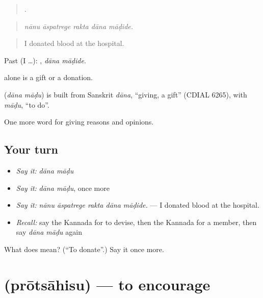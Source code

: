 \begin{quote}
    .
\end{quote}

\begin{quote}
\emph{nānu āspatrege rakta dāna māḍide.}
\end{quote}

\begin{quote}
I donated blood at the hospital.
\end{quote}

Past (I …):  , \emph{dāna māḍide}.

 alone is a gift or a donation.

\begin{cousinweb}
\textbf{ } (\emph{dāna māḍu}) is built from Sanskrit \emph{dāna}, \textquotedblleft{}giving, a gift\textquotedblright{} (CDIAL 6265), with \emph{māḍu}, \textquotedblleft{}to do\textquotedblright{}.
\end{cousinweb}

\begin{grammarlens}[title={What you've built}]
One more word for giving reasons and opinions.
\end{grammarlens}

\subsection*{Your turn}
\begin{itemize}
\raggedright
  \item \emph{Say it:} \emph{dāna māḍu}
  \item \emph{Say it:} \emph{dāna māḍu}, once more
  \item \emph{Say it:} \emph{nānu āspatrege rakta dāna māḍide.} — I donated blood at the hospital.
  \item \emph{Recall:} say the Kannada for to devise, then the Kannada for a member, then say \emph{dāna māḍu} again
\end{itemize}

\begin{tcolorbox}[breakable,colback=teal!4,colframe=teal!35!black,title={Before you move on}]
What does   mean? (\textquotedblleft{}To donate\textquotedblright{}.) Say it once more.
\end{tcolorbox}
\section[\texorpdfstring{\kn{ಪ್ರೋತ್ಸಾಹಿಸು} (prōtsāhisu)}{ಪ್ರೋತ್ಸಾಹಿಸು (prōtsāhisu)}]{ (prōtsāhisu) — to encourage}

